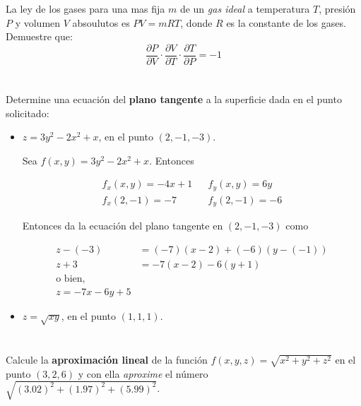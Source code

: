 \documentclass[12pt]{article}
\begin{document}
La ley de los gases para una mas fija $m$ de un \textit{gas ideal} a temperatura $T$, presión $P$ y volumen $V$ absoulutos es $P V = mRT$, donde $R$ es la constante de los gases. Demuestre que:
$$\frac{\partial P}{\partial V} \cdot \frac{\partial V}{\partial T} \cdot \frac{\partial T}{\partial P} = -1$$

\section{}

Determine una ecuación del \textbf{plano tangente} a la superficie dada en el punto solicitado:

\begin{itemize}[format=\textbf]

\item $z=3y^2-2x^2+x$, en el punto $(2,-1,-3)$.

Sea $f(x,y)=3y^2-2x^2+x$. Entonces 

\begin{align*}
f_x(x,y)=-4x+1 
&&
f_y(x,y)=6y \\
f_x(2,-1)=-7
&&
f_y(2,-1)=-6
\end{align*}

Entonces da la ecuación del plano tangente en $(2,-1,-3)$ como

\begin{align*}
z-(-3)&=(-7)(x-2)+(-6)(y-(-1)) \\
z+3&=-7(x-2)-6(y+1) \\
\text{o bien,}\\
z=-7x-6y+5
\end{align*}

\item $z=\sqrt{xy}$, en el punto $(1,1,1)$.

\end{itemize}

\section{}

Calcule la \textbf{aproximación lineal} de la función $f(x,y,z)=\sqrt{x^2+y^2+z^2}$ en el punto $(3,2,6)$ y con ella \textit{aproxime} el número $\sqrt{(3.02)^2+(1.97)^2+(5.99)^2}$.
\end{document}
